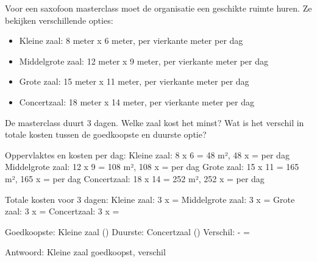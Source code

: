 \begin{opgave}
Voor een saxofoon masterclass moet de organisatie een geschikte ruimte huren.
Ze bekijken verschillende opties:

\begin{itemize}
\item Kleine zaal: 8 meter x 6 meter,  per vierkante meter per dag
\item Middelgrote zaal: 12 meter x 9 meter,  per vierkante meter per dag
\item Grote zaal: 15 meter x 11 meter,  per vierkante meter per dag
\item Concertzaal: 18 meter x 14 meter,  per vierkante meter per dag
\end{itemize}

De masterclass duurt 3 dagen. Welke zaal kost het minst? Wat is het verschil
in totale kosten tussen de goedkoopste en duurste optie?
\end{opgave}

\begin{oplossing}
Oppervlaktes en kosten per dag:
Kleine zaal: 8 x 6 = 48 m², 48 x  =  per dag
Middelgrote zaal: 12 x 9 = 108 m², 108 x  =  per dag
Grote zaal: 15 x 11 = 165 m², 165 x  =  per dag
Concertzaal: 18 x 14 = 252 m², 252 x  =  per dag

Totale kosten voor 3 dagen:
Kleine zaal: 3 x  = 
Middelgrote zaal: 3 x  = 
Grote zaal: 3 x  = 
Concertzaal: 3 x  = 

Goedkoopste: Kleine zaal ()
Duurste: Concertzaal ()
Verschil:  -  = 

Antwoord: Kleine zaal goedkoopst, verschil 
\end{oplossing}